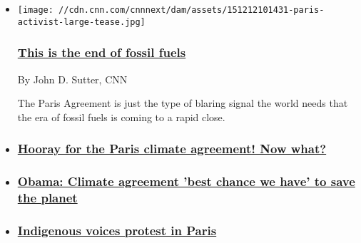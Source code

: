 \begin{itemize}
\item
  \href{/2015/12/12/opinions/sutter-cop21-climate-reaction/index.html}{}

  \texttt{[image: //cdn.cnn.com/cnnnext/dam/assets/151212101431-paris-activist-large-tease.jpg]}

  \hypertarget{this-is-the-end-of-fossil-fuels}{%
  \subsubsection{\texorpdfstring{\href{/2015/12/12/opinions/sutter-cop21-climate-reaction/index.html}{This
  is the end of fossil
  fuels}}{This is the end of fossil fuels}}\label{this-is-the-end-of-fossil-fuels}}

  By John D. Sutter, CNN

  The Paris Agreement is just the type of blaring signal the world needs
  that the era of fossil fuels is coming to a rapid close.
\item
  \hypertarget{hooray-for-the-paris-climate-agreement-now-what-}{%
  \subsubsection{\texorpdfstring{\href{/2015/12/14/opinions/sutter-cop21-climate-5-things/index.html}{Hooray
  for the Paris climate agreement! Now what?
  }}{Hooray for the Paris climate agreement! Now what? }}\label{hooray-for-the-paris-climate-agreement-now-what-}}
\item
  \hypertarget{obama-climate-agreement-best-chance-we-have-to-save-the-planet}{%
  \subsubsection{\texorpdfstring{\href{/2015/12/12/world/global-climate-change-conference-vote/index.html}{Obama:
  Climate agreement 'best chance we have' to save the
  planet}}{Obama: Climate agreement 'best chance we have' to save the planet}}\label{obama-climate-agreement-best-chance-we-have-to-save-the-planet}}
\item
  \hypertarget{indigenous-voices-protest-in-paris}{%
  \subsubsection{\texorpdfstring{\href{/videos/world/2015/12/09/paris-canal-protest-cop21-sutter.cnn}{Indigenous
  voices protest in
  Paris}}{Indigenous voices protest in Paris}}\label{indigenous-voices-protest-in-paris}}
\end{itemize}

